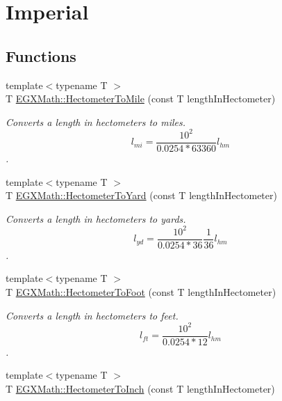 \hypertarget{group___e_g_x_math-_conversions-_length_conversions-_hectometer-_imperial}{}\section{Imperial}
\label{group___e_g_x_math-_conversions-_length_conversions-_hectometer-_imperial}
\subsection*{Functions}
\begin{DoxyCompactItemize}
\item 
{\footnotesize template$<$typename T $>$ }\\T \mbox{\hyperlink{group___e_g_x_math-_conversions-_length_conversions-_hectometer-_imperial_gabb3930dfb3335dc53303ec8ce9145d71}{E\+G\+X\+Math\+::\+Hectometer\+To\+Mile}} (const T length\+In\+Hectometer)
\begin{DoxyCompactList}\small\item\em Converts a length in hectometers to miles. \[ l_{mi}=\frac{10^{2}}{0.0254 * 63360} l_{hm} \]. \end{DoxyCompactList}\item 
{\footnotesize template$<$typename T $>$ }\\T \mbox{\hyperlink{group___e_g_x_math-_conversions-_length_conversions-_hectometer-_imperial_ga84866f087daa74cdd00348f42462d13c}{E\+G\+X\+Math\+::\+Hectometer\+To\+Yard}} (const T length\+In\+Hectometer)
\begin{DoxyCompactList}\small\item\em Converts a length in hectometers to yards. \[ l_{yd}= \frac{10^{2}}{0.0254 * 36} \frac{1}{36} l_{hm} \]. \end{DoxyCompactList}\item 
{\footnotesize template$<$typename T $>$ }\\T \mbox{\hyperlink{group___e_g_x_math-_conversions-_length_conversions-_hectometer-_imperial_ga8b57e6e5bef662cc96b8b7dde68659a6}{E\+G\+X\+Math\+::\+Hectometer\+To\+Foot}} (const T length\+In\+Hectometer)
\begin{DoxyCompactList}\small\item\em Converts a length in hectometers to feet. \[ l_{ft}= \frac{10^{2}}{0.0254 * 12} l_{hm} \]. \end{DoxyCompactList}\item 
{\footnotesize template$<$typename T $>$ }\\T \mbox{\hyperlink{group___e_g_x_math-_conversions-_length_conversions-_hectometer-_imperial_ga21fd4a7228c229b0b229fd0fab224998}{E\+G\+X\+Math\+::\+Hectometer\+To\+Inch}} (const T length\+In\+Hectometer)

\end{DoxyCompactItemize}
